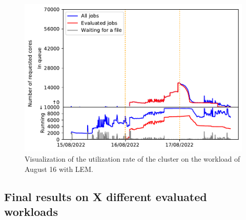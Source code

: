 \documentclass[conference,10pt]{IEEEtran}
\begin{document}
\begin{figure}[H]\centering\includegraphics[scale=0.47]{../MBSS/plot/Cluster_usage/2022-08-16->2022-08-16_V10000_Fcfs_with_a_score_mixed_strategy_x500_x1_x0_x0_Used_nodes_Reduced_450_128_32_256_4_1024_core_by_core.pdf}\caption{Visualization of the utilization rate of the cluster on the workload of August 16 with LEM.}\end{figure}


\subsection{Final results on X different evaluated workloads}
\end{document}
